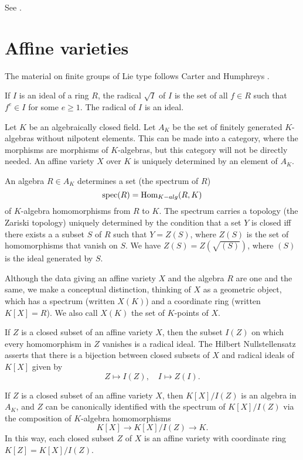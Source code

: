 See \cite{wilson2009finite}.  

\section{Affine varieties}\label{section-affine-varieties}


The material on finite groups of Lie type follows Carter
\cite{carter1985finite} and Humphreys \cite{humphreys2012linear}.

If $I$ is an ideal of a ring $R$, the radical $\sqrt{I}$ of $I$ is the
set of all $f \in R$ such that $f^e \in I$ for some $e\ge 1$.  The
radical of $I$ is an ideal.

Let $K$ be an algebraically closed field.  Let $A_K$ be the set of
finitely generated $K$-algebras without nilpotent elements.  This can
be made into a category, where the morphisms are morphisms of
$K$-algebras, but this category will not be directly needed.  An
affine variety $X$ over $K$ is uniquely determined by an element of
$A_K$.

An algebra $R\in A_K$ determines a set (the spectrum of $R$)
\[
\text{spec}(R) = \text{Hom}_{K-alg}(R,K)
\]
of $K$-algebra homomorphisms from $R$ to $K$.  The spectrum carries a
topology (the Zariski topology) uniquely determined by the condition
that a set $Y$ is closed iff there exists a a subset $S$ of $R$ such
that $Y=Z(S)$, where $Z(S)$ is the set of homomorphisms that vanish on
$S$.  We have $Z(S) = Z(\sqrt{(S)})$, where $(S)$ is the ideal
generated by $S$.

Although the data giving an affine variety $X$ and the algebra $R$ are
one and the same, we make a conceptual distinction, thinking of $X$ as
a geometric object, which has a spectrum (written $X(K)$) and a
coordinate ring (written $K[X]=R$).  We also call $X(K)$ the set of
$K$-points of $X$.

If $Z$ is a closed subset of an affine variety $X$, then the subset
$I(Z)$ on which every homomorphism in $Z$ vanishes is a radical ideal.
The Hilbert Nullstellensatz asserts that there is a bijection between
closed subsets of $X$ and radical ideals of $K[X]$ given by
\[
Z \mapsto I(Z),\quad I\mapsto Z(I).
\]

If $Z$ is a closed subset of an affine variety $X$, then $K[X]/I(Z)$
is an algebra in $A_K$, and $Z$ can be canonically identified with the
spectrum of $K[X]/I(Z)$ via the composition of $K$-algebra
homomorphisms
\[
K[X] \to K[X]/I(Z) \to K.
\]
In this way, each closed subset $Z$ of $X$ is an affine variety with
coordinate ring $K[Z] = K[X]/I(Z)$.

